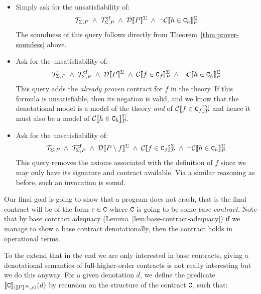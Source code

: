 \documentclass[preprint,nocopyrightspace]{sigplanconf}
\begin{document}
\begin{itemize}
  \item Simply ask for the unsatisfiability of: 
    \[  \Th{\Sigma}{P}\;\land\;
        \Th{\Sigma}{P}^{\lcfZ}\;\land\;\dtrans{\Sigma}{P}\;\land\;\neg\ctrans{\Sigma}{P}{h \in \Ct_h} \] 
        The soundness of this query follows directly from Theorem~\ref{thm:prover-soundess} above.

  \item Ask for the unsatisfiability of:
    \[  \Th{\Sigma}{P}\;\land\;
        \Th{\Sigma}{P}^{\lcfZ}\;\land\;\dtrans{\Sigma}{P}\;\land\;\ctrans{\Sigma}{P}{f \in \Ct_f}\;\land\;\neg\ctrans{\Sigma}{P}{h \in \Ct_h}     \] 
        This query adds the {\em already proven} contract for $f$ in the theory. If this formula
        is unsatisfiable, then its negation is valid, and we know that the denotational model is 
        a model of the theory {\em and} of $\ctrans{\Sigma}{P}{f \in \Ct_f}$ and hence it must also
        be a model of $\ctrans{\Sigma}{P}{h \in \Ct_h}$. 
  \item Ask for the unsatisfiability of:
    \[  \Th{\Sigma}{P}\;\land\;
        \Th{\Sigma}{P}^{\lcfZ}\;\land\;\dtrans{\Sigma}{P \setminus f}\;\land\;\ctrans{\Sigma}{P}{f \in \Ct_f}\;\land\;
        \neg\ctrans{\Sigma}{P}{h \in \Ct_h}     \] 
        This query removes the axioms associated with the definition of $f$ since we may only have 
        its signature and contract available. Via a similar reasoning as before, such an invocation 
        is sound.
\end{itemize}

Our final goal is going to show that a program does not crash, that
is the final contract will be of the form $e \in \Ct$ where $\Ct$ is
going to be some {\em base contract}. Note that by base contract adequacy
(Lemma~\ref{lem:base-contract-adequacy}) if we manage to show a base contract 
denotationally, then the contract holds in operational terms.

To the extend that in the end we are only interested in base contracts, giving a 
denotational semantics of full-higher-order contracts is not really interesting 
but we do this anyway. For a given denotation $d$, we define the 
predicate $\interp{\Ct}{\dbrace{P}^\infty}{\rho}(d)$ by recursion on the structure 
of the contract $\Ct$, such that:
\end{document}
